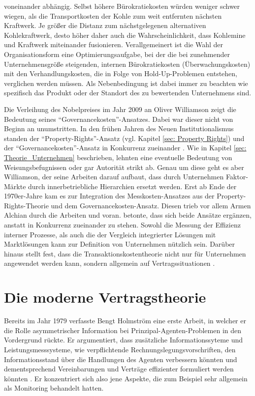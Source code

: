 voneinander abhängig. Selbst höhere Bürokratiekosten würden weniger schwer wiegen, als die Transportkosten der Kohle zum weit entfernten nächsten Kraftwerk. Je größer die Distanz zum nächstgelegenen alternativen Kohlekraftwerk, desto höher daher auch die Wahrscheinlichkeit, dass Kohlemine und Kraftwerk miteinander fusionieren. Verallgemeinert ist die Wahl der Organisationsform eine Optimierungsaufgabe, bei der die bei zunehmender Unternehmensgröße steigenden, internen Bürokratiekosten (Überwachungskosten) mit den Verhandlungskosten, die in Folge von Hold-Up-Problemen entstehen, verglichen werden müssen. Als Nebenbedingung ist dabei immer zu beachten wie spezifisch das Produkt oder der Standort des zu bewertenden Unternehmens sind. 
 
Die Verleihung des Nobelpreises im Jahr 2009 an Oliver Williamson zeigt die Bedeutung seines "`Governancekosten"'-Ansatzes. Dabei war dieser nicht von Beginn an unumstritten. In den frühen Jahren des Neuen Institutionalismus standen der "`Property-Rights"'-Ansatz (vgl. Kapitel \ref{sec: Property Rights}) und der "`Governancekosten"'-Ansatz in Konkurrenz zueinander \parencite[S. 190]{Erlei2016}. Wie in Kapitel \ref{sec: Theorie_Unternehmen} beschrieben, lehnten \textcite{Alchian1972} eine eventuelle Bedeutung von Weisungsbefugnissen oder gar Autorität strikt ab. Genau um diese geht es aber Williamson, der seine Arbeiten darauf aufbaut, dass durch Unternehmen Faktor-Märkte durch innerbetriebliche Hierarchien ersetzt werden. Erst ab Ende der 1970er-Jahre kam es zur Integration des Messkosten-Ansatzes aus der Property-Rights-Theorie und dem Governancekosten-Ansatz. Diesen trieb vor allem Armen Alchian durch die Arbeiten \textcite{Klein1978} und \textcite{Alchian1984} voran. \textcite{Alchian1984} betonte, dass sich beide Ansätze ergänzen, anstatt in Konkurrenz zueinander zu stehen. Sowohl die Messung der Effizienz interner Prozesse, als auch die der Vergleich integrierter Lösungen mit Marktlösungen kann zur Definition von Unternehmen nützlich sein. Darüber hinaus stellt \textcite{Alchian1984} fest, dass die Transaktionskostentheorie nicht nur für Unternehmen angewendet werden kann, sondern allgemein auf Vertragssituationen \parencite[S. 190]{Erlei2016}. 

\section{Die moderne Vertragstheorie}
\label{sec: Moderne Vertragstheorie}

Bereits im Jahr 1979 verfasste Bengt Holmström eine erste Arbeit, in welcher er die Rolle asymmetrischer Information bei Prinzipal-Agenten-Problemen in den Vordergrund rückte. Er argumentiert, dass zusätzliche Informationssyteme und Leistungsmesssysteme, wie verpflichtende Rechnungslegungsvorschriften, den Informationsstand über die Handlungen des Agenten verbessern könnten und dementsprechend Vereinbarungen und Verträge effizienter formuliert werden könnten \parencite[S. 89]{Holmstrom1979}. Er konzentriert sich also jene Aspekte, die zum Beispiel \textcite{Jensen1976} sehr allgemein als Monitoring behandelt hatten.

